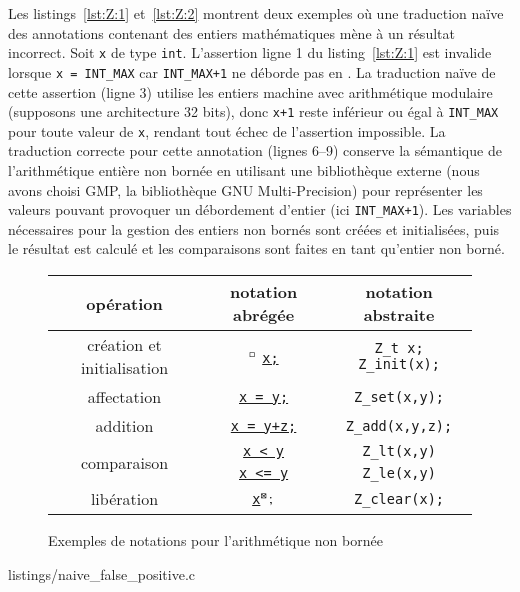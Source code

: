 Les listings~\ref{lst:Z:1} et~\ref{lst:Z:2} montrent deux exemples où
une traduction naïve des annotations contenant des entiers mathématiques mène
à un résultat incorrect.
Soit \lstinline'x' de type \lstinline'int'.
L'assertion ligne 1 du listing~\ref{lst:Z:1} est invalide lorsque
\lstinline'x = INT_MAX' car \lstinline'INT_MAX+1' ne déborde pas en \eacsl.
La traduction naïve de cette assertion (ligne 3) utilise les entiers machine
avec arithmétique modulaire (supposons une architecture 32 bits), donc
\lstinline'x+1' reste inférieur ou égal à \lstinline'INT_MAX' pour toute valeur
de \lstinline'x', rendant tout échec de l'assertion impossible.
La traduction correcte pour cette annotation (lignes 6--9) conserve la
sémantique de l'arithmétique entière non bornée en utilisant une bibliothèque
externe (nous avons choisi GMP, la bibliothèque GNU Multi-Precision) pour
représenter les valeurs pouvant provoquer un débordement d'entier (ici
\lstinline'INT_MAX+1').
Les variables nécessaires pour la gestion des entiers non bornés sont créées et
initialisées, puis le résultat est calculé et les comparaisons sont faites en
tant qu'entier non borné.

\begin{figure}\centering
  \begin{tabular}{c|c|c}
    \textbf{opération} & \textbf{notation abrégée} & \textbf{notation abstraite}
    \\ \hline
    création et initialisation & ${^\square}$ \underline{\lstinline'x;'}
    & \lstinline'Z_t x; Z_init(x);' \\
    \hline
    affectation & \underline{\lstinline'x = y;'} & \lstinline'Z_set(x,y);' \\
    \hline
    addition & \underline{\lstinline'x = y+z;'} & \lstinline'Z_add(x,y,z);' \\
    \hline
    \multirow{2}{*}{comparaison} & \underline{\lstinline'x < y'}
    & \lstinline'Z_lt(x,y)' \\
    & \underline{\lstinline'x <= y'} & \lstinline'Z_le(x,y)' \\
    \hline
    libération & \underline{\lstinline'x'}$\Zclear\semicolon$
    & \lstinline'Z_clear(x);' \\
  \end{tabular}
  \caption{Exemples de notations pour l'arithmétique non bornée
    \label{fig:Z-not}}
\end{figure}


                {listings/naive_false_positive.c}


